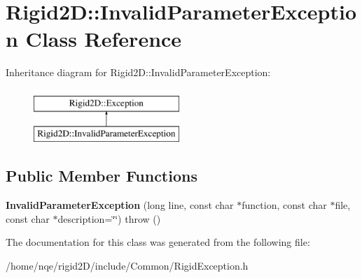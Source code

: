 \hypertarget{class_rigid2_d_1_1_invalid_parameter_exception}{
\section{Rigid2D::InvalidParameterException Class Reference}
\label{class_rigid2_d_1_1_invalid_parameter_exception}
}
Inheritance diagram for Rigid2D::InvalidParameterException:\begin{figure}[H]
\begin{center}
\leavevmode
\includegraphics[height=2cm]{class_rigid2_d_1_1_invalid_parameter_exception}
\end{center}
\end{figure}
\subsection*{Public Member Functions}
\begin{DoxyCompactItemize}
\item 
\hypertarget{class_rigid2_d_1_1_invalid_parameter_exception_a3afc862f613c20e43b5539dde3744fc7}{
{\bfseries InvalidParameterException} (long line, const char $\ast$function, const char $\ast$file, const char $\ast$description=\char`\"{}\char`\"{})  throw ()}
\label{class_rigid2_d_1_1_invalid_parameter_exception_a3afc862f613c20e43b5539dde3744fc7}

\end{DoxyCompactItemize}


The documentation for this class was generated from the following file:\begin{DoxyCompactItemize}
\item 
/home/nqe/rigid2D/include/Common/RigidException.h\end{DoxyCompactItemize}
